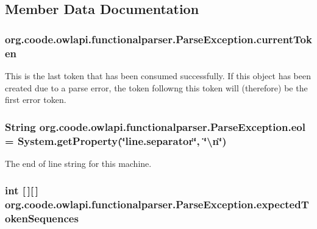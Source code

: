 \subsection{Member Data Documentation}
\hypertarget{classorg_1_1coode_1_1owlapi_1_1functionalparser_1_1_parse_exception_a95fb43c042d0cb8076312c0d2b7fc2b4}{
\subsubsection[{current\-Token}]{ org.\-coode.\-owlapi.\-functionalparser.\-Parse\-Exception.\-current\-Token}}\label{classorg_1_1coode_1_1owlapi_1_1functionalparser_1_1_parse_exception_a95fb43c042d0cb8076312c0d2b7fc2b4}
This is the last token that has been consumed successfully. If this object has been created due to a parse error, the token followng this token will (therefore) be the first error token. \hypertarget{classorg_1_1coode_1_1owlapi_1_1functionalparser_1_1_parse_exception_a28ce8b5eea9d5730c7a9e17b9347e9ce}{
\subsubsection[{eol}]{\setlength{\rightskip}{0pt plus 5cm}String org.\-coode.\-owlapi.\-functionalparser.\-Parse\-Exception.\-eol = System.\-get\-Property(\char`\"{}line.\-separator\char`\"{}, \char`\"{}\textbackslash{}n\char`\"{})\hspace{0.3cm}{\ttfamily [protected]}}}\label{classorg_1_1coode_1_1owlapi_1_1functionalparser_1_1_parse_exception_a28ce8b5eea9d5730c7a9e17b9347e9ce}
The end of line string for this machine. \hypertarget{classorg_1_1coode_1_1owlapi_1_1functionalparser_1_1_parse_exception_afa77568b87bfcc8bbc2460a8efd1a15f}{
\subsubsection[{expected\-Token\-Sequences}]{\setlength{\rightskip}{0pt plus 5cm}int \mbox{[}$\,$\mbox{]}\mbox{[}$\,$\mbox{]} org.\-coode.\-owlapi.\-functionalparser.\-Parse\-Exception.\-expected\-Token\-Sequences}}\label{classorg_1_1coode_1_1owlapi_1_1functionalparser_1_1_parse_exception_afa77568b87bfcc8bbc2460a8efd1a15f}
